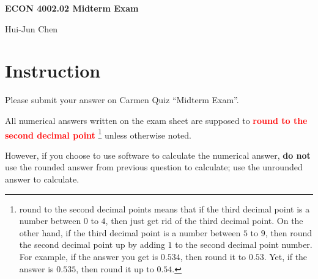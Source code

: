 \documentclass[14pt]{extarticle}
\newcommand{\red}[1]{\textcolor{red}{#1}}
\newcommand{\showAns}{\setboolean{showAns}{true}}
\begin{document}
\centerline{\huge\bf ECON 4002.02 Midterm Exam}
\smallskip
\centerline{\LARGE Hui-Jun Chen}

\medskip


\section*{Instruction}
\label{sec:Instruction}
Please submit your answer on Carmen Quiz ``Midterm Exam''.

All numerical answers written on the exam sheet are supposed to \red{\textbf{round to the second decimal point}}%
\footnote{round to the second decimal points means that if the third decimal point is a number between $ 0 $ to $ 4 $, then just get rid of the third decimal point. On the other hand, if the third decimal point is a number between $ 5 $ to $ 9 $, then round the second decimal point up by adding $ 1 $ to the second decimal point number. For example, if the answer you get is $ 0.534 $, then round it to $ 0.53 $. Yet, if the answer is $ 0.535 $, then round it up to $ 0.54 $.}
unless otherwise noted.

However, if you choose to use software to calculate the numerical answer, \textbf{do not} use the rounded answer from previous question to calculate; use the unrounded answer to calculate.


\end{document}
